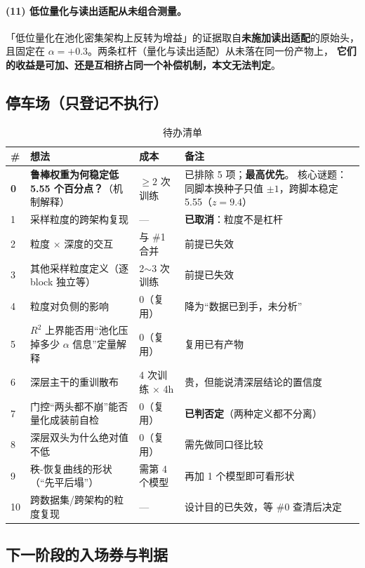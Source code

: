 \documentclass[11pt,a4paper]{ctexart}
\begin{document}
\paragraph{(11) 低位量化与读出适配从未组合测量。}
「低位量化在池化密集架构上反转为增益」的证据取自\textbf{未施加读出适配}的原始头，
且固定在 $\alpha=+0.3$。两条杠杆（量化与读出适配）从未落在同一份产物上，
\textbf{它们的收益是可加、还是互相挤占同一个补偿机制，本文无法判定}。

\subsection{停车场（只登记不执行）}

\begin{table}[h]
\centering
\caption{待办清单}
\label{tab:parking}
\small
\begin{tabular}{p{0.6cm}p{6.4cm}p{2.4cm}p{5.0cm}}
\toprule
\# & 想法 & 成本 & 备注 \\
\midrule
\textbf{0} & \textbf{鲁棒权重为何稳定低 5.55 个百分点？}（机制解释）
& $\ge2$ 次训练 & 已排除 5 项；\textbf{最高优先}。
  核心谜题：同脚本换种子只值 $\pm1$，跨脚本稳定 5.55（$z=9.4$） \\
1 & 采样粒度的跨架构复现 & --- & \textbf{已取消}：粒度不是杠杆 \\
2 & 粒度 $\times$ 深度的交互 & 与 \#1 合并 & 前提已失效 \\
3 & 其他采样粒度定义（逐 block 独立等） & 2$\sim$3 次训练 & 前提已失效 \\
4 & 粒度对负侧的影响 & 0（复用） & 降为“数据已到手，未分析” \\
5 & $R^2$ 上界能否用“池化压掉多少 $\alpha$ 信息”定量解释 & 0（复用） & 复用已有产物 \\
6 & 深层主干的重训散布 & 4 次训练 $\times$ 4h & 贵，但能说清深层结论的置信度 \\
7 & 门控“两头都不崩”能否量化成装前自检 & 0（复用） & \textbf{已判否定}（两种定义都不分离） \\
8 & 深层双头为什么绝对值不低 & 0（复用） & 需先做同口径比较 \\
9 & 秩-恢复曲线的形状（“先平后塌”） & 需第 4 个模型 & 再加 1 个模型即可看形状 \\
10 & 跨数据集/跨架构的粒度复现 & --- & 设计目的已失效，等 \#0 查清后决定 \\
\bottomrule
\end{tabular}
\end{table}

\subsection{下一阶段的入场券与判据}
\end{document}
